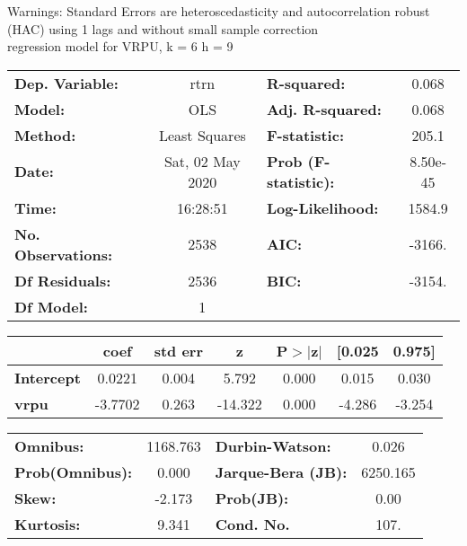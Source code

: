 Warnings: \newline
 [1] Standard Errors are heteroscedasticity and autocorrelation robust (HAC) using 1 lags and without small sample correction\\ 

regression model for VRPU, k = 6 h = 9\begin{center}
\begin{tabular}{lclc}
\toprule
\textbf{Dep. Variable:}    &       rtrn       & \textbf{  R-squared:         } &     0.068   \\
\textbf{Model:}            &       OLS        & \textbf{  Adj. R-squared:    } &     0.068   \\
\textbf{Method:}           &  Least Squares   & \textbf{  F-statistic:       } &     205.1   \\
\textbf{Date:}             & Sat, 02 May 2020 & \textbf{  Prob (F-statistic):} &  8.50e-45   \\
\textbf{Time:}             &     16:28:51     & \textbf{  Log-Likelihood:    } &    1584.9   \\
\textbf{No. Observations:} &        2538      & \textbf{  AIC:               } &    -3166.   \\
\textbf{Df Residuals:}     &        2536      & \textbf{  BIC:               } &    -3154.   \\
\textbf{Df Model:}         &           1      & \textbf{                     } &             \\
\bottomrule
\end{tabular}
\begin{tabular}{lcccccc}
                   & \textbf{coef} & \textbf{std err} & \textbf{z} & \textbf{P$> |$z$|$} & \textbf{[0.025} & \textbf{0.975]}  \\
\midrule
\textbf{Intercept} &       0.0221  &        0.004     &     5.792  &         0.000        &        0.015    &        0.030     \\
\textbf{vrpu}      &      -3.7702  &        0.263     &   -14.322  &         0.000        &       -4.286    &       -3.254     \\
\bottomrule
\end{tabular}
\begin{tabular}{lclc}
\textbf{Omnibus:}       & 1168.763 & \textbf{  Durbin-Watson:     } &    0.026  \\
\textbf{Prob(Omnibus):} &   0.000  & \textbf{  Jarque-Bera (JB):  } & 6250.165  \\
\textbf{Skew:}          &  -2.173  & \textbf{  Prob(JB):          } &     0.00  \\
\textbf{Kurtosis:}      &   9.341  & \textbf{  Cond. No.          } &     107.  \\
\bottomrule
\end{tabular}
\end{center}

